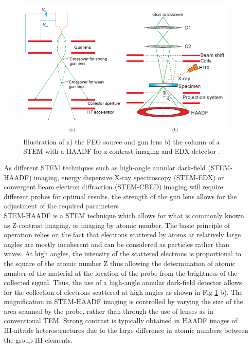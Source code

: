 \begin{figure}[!ht]
	\centering
	\includegraphics[width=1\textwidth]{Figs/Ch2/STEM}
	\caption[h] {Illustration of a) the FEG source and gun lens b) the column of a STEM with a HAADF for z-contrast imaging and EDX detector \cite{Zhang2008}.}
	\label{STEM}
\end{figure}
\FloatBarrier

As different STEM techniques such as high-angle annular dark-field (STEM-HAADF) imaging, energy dispersive X-ray spectroscopy (STEM-EDX) or convergent beam electron diffraction (STEM-CBED) imaging will require different probes for optimal results, the strength of the gun lens allows for the adjustment of the required parameters \cite{DavidB.Williams2009}.\\
STEM-HAADF is a STEM technique which allows for what is commonly known as Z-contrast imaging, or imaging by atomic number. The basic principle of operation relies on the fact that electrons scattered by atoms at relatively large angles are mostly incoherent and can be considered as particles rather than waves. At high angles, the intensity of the scattered electrons is proportional to the square of the atomic number Z \cite{Howie1979} thus allowing the determination of atomic number of the material at the location of the probe from the brightness of the collected signal. Thus, the use of a high-angle annular dark-field detector allows for the collection of electrons scattered at high angles as shown in Fig \ref{STEM} b). The magnification in STEM-HAADF imaging
is controlled by varying the size of the area scanned by the probe, rather than through the use of lenses as in conventional TEM. Strong contrast is typically obtained in HAADF images of III-nitride heterostructures due to the large difference in atomic numbers between the group III elements.

